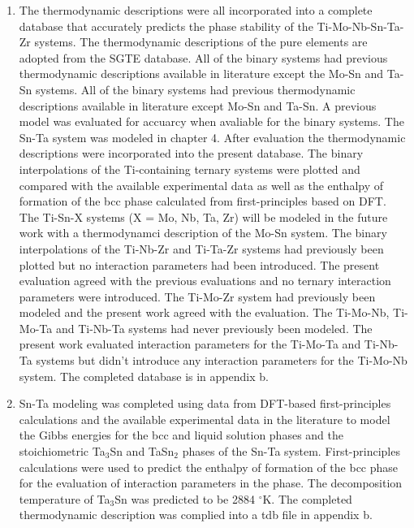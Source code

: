 \begin{enumerate}
	\item The thermodynamic descriptions were all incorporated into a complete database that accurately predicts the phase stability of the Ti-Mo-Nb-Sn-Ta-Zr systems. The thermodynamic descriptions of the pure elements are adopted from the SGTE database. All of the binary systems had previous thermodynamic descriptions available in literature except the Mo-Sn and Ta-Sn systems. All of the binary systems had previous thermodynamic descriptions available in literature except Mo-Sn and Ta-Sn. A previous model was evaluated for accuarcy when avaliable for the binary systems. The Sn-Ta system was modeled in chapter 4. After evaluation the thermodynamic descriptions were incorporated into the present database. The binary interpolations of the Ti-containing ternary systems were plotted and compared with the available experimental data as well as the enthalpy of formation of the bcc phase calculated from first-principles based on DFT. The Ti-Sn-X systems (X = Mo, Nb, Ta, Zr) will be modeled in the future work with a thermodynamci description of the Mo-Sn system. The binary interpolations of the Ti-Nb-Zr and Ti-Ta-Zr systems had previously been plotted but no interaction parameters had been introduced. The present evaluation agreed with the previous evaluations and no ternary interaction parameters were introduced. The Ti-Mo-Zr system had previously been modeled and the present work agreed with the evaluation. The Ti-Mo-Nb, Ti-Mo-Ta and Ti-Nb-Ta systems had never previously been modeled. The present work evaluated interaction parameters for the Ti-Mo-Ta and Ti-Nb-Ta systems but didn't introduce any interaction parameters for the Ti-Mo-Nb system. The completed database is in appendix b. 
	\item Sn-Ta modeling was completed using data from DFT-based first-principles calculations and the available experimental data in the literature to model the Gibbs energies for the bcc and liquid solution phases and the stoichiometric Ta$_3$Sn and TaSn$_2$ phases of the Sn-Ta system. First-principles calculations were used to predict the enthalpy of formation of the bcc phase for the evaluation of interaction parameters in the phase. The decomposition temperature of Ta$_3$Sn was predicted to be 2884 $^\circ$K. The completed thermodynamic description was complied into a tdb file in appendix b.

\end{enumerate}
